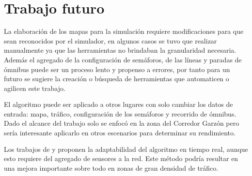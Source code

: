 \section{Trabajo futuro}

La elaboración de los mapas para la simulación requiere modificaciones para que sean reconocidos por el simulador, en algunos casos se tuvo que realizar manualmente ya que las herramientas no brindaban la granularidad necesaria.
Además el agregado de la configuración de semáforos, de las líneas y paradas de ómnibus puede ser un proceso lento y propenso a errores, por tanto para un futuro se sugiere la creación o búsqueda de herramientas que automaticen o agilicen este trabajo.

El algoritmo puede ser aplicado a otros lugares con solo cambiar los datos de entrada: mapa, tráfico, configuración de los semáforos y recorrido de ómnibus. Dado el alcance del trabajo solo se enfocó en la zona del Corredor Garzón pero sería interesante aplicarlo en otros escenarios para determinar su rendimiento.

Los trabajos de  \citet{Montana1996} y \citet{Vogel2000}  proponen la adaptabilidad del algoritmo en tiempo real, aunque esto requiere del agregado de sensores a la red. Este método podría resultar en una mejora importante sobre todo en zonas de gran densidad de tráfico.

